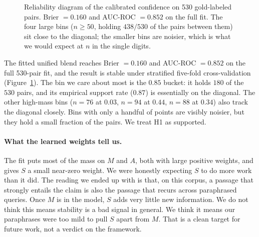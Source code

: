 \documentclass[10pt]{article}
\begin{document}
\begin{figure}[t]
\centering
{}
\caption{Reliability diagram of the calibrated confidence on 530
gold-labeled pairs. Brier $=0.160$ and AUC-ROC $=0.852$ on the
full fit. The four large bins ($n \geq 50$, holding $438/530$ of the
pairs between them) sit close to the diagonal; the smaller bins are
noisier, which is what we would expect at $n$ in the single digits.}
\label{fig:h1}
\end{figure}

The fitted unified blend reaches Brier $=0.160$ and AUC-ROC
$=0.852$ on the full 530-pair fit, and the result is stable
under stratified five-fold cross-validation
(Figure~\ref{fig:h1}). The bin we care about most is the $0.85$
bucket: it holds $180$ of the $530$ pairs, and its empirical
support rate ($0.87$) is essentially on the diagonal. The other
high-mass bins ($n=76$ at $0.03$, $n=94$ at $0.44$, $n=88$ at
$0.34$) also track the diagonal closely. Bins with only a handful
of points are visibly noisier, but they hold a small fraction of
the pairs. We treat H1 as supported.

\paragraph{What the learned weights tell us.}
The fit puts most of the mass on $M$ and $A$, both with large
positive weights, and gives $S$ a small near-zero weight. We were
honestly expecting $S$ to do more work than it did. The reading we
ended up with is that, on this corpus, a passage that strongly
entails the claim is also the passage that recurs across paraphrased
queries. Once $M$ is in the model, $S$ adds very little new
information. We do not think this means stability is a bad signal in
general. We think it means our paraphrases were too mild to pull $S$
apart from $M$. That is a clean target for future work, not a
verdict on the framework.
\end{document}
